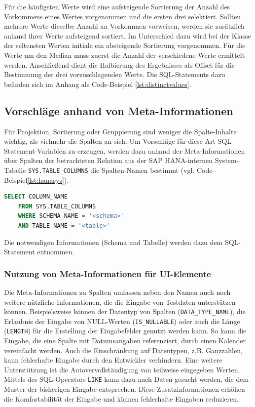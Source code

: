 Für die häufigsten Werte wird eine aufsteigende Sortierung der Anzahl des Vorkommens eines Wertes vorgenommen und die ersten drei selektiert.
Sollten mehrere Werte dieselbe Anzahl an Vorkommen vorweisen, werden sie zusätzlich anhand ihrer Werte aufsteigend sortiert.
Im Unterschied dazu wird bei der Klasse der seltensten Werten initiale ein absteigende Sortierung vorgenommen.
Für die Werte um den Median muss zuerst die Anzahl der verschiedene Werte ermittelt werden.
Anschließend dient die Halbierung des Ergebnisses als Offset für die Bestimmung der drei vorzuschlagenden Werte.
Die SQL-Statements dazu befinden sich im Anhang als Code-Beispiel \ref{lst:distinctvalues}.

\subsection{Vorschläge anhand von Meta-Informationen}\label{chap:databasemeta}
Für Projektion, Sortierung oder Gruppierung sind weniger die Spalte-Inhalte wichtig, als vielmehr die Spalten an sich.
Um Vorschläge für diese Art SQL-Statement-Variablen zu erzeugen, werden dazu anhand der Meta-Informationen über Spalten der betrachteten Relation aus der SAP HANA-internen System-Tabelle \texttt{SYS.TABLE\_COLUMNS} die Spalten-Namen bestimmt (vgl. Code-Beispiel\ref{lst:hanasys}).
\begin{lstlisting}[caption={Systemtabellen von SAP HANA liefern Meta-Informationen zu Relationen}, label={lst:hanasys}, language=SQL]
	SELECT COLUMN_NAME
	FROM SYS.TABLE_COLUMNS
	WHERE SCHEMA_NAME = '<schema>'
	AND TABLE_NAME = '<table>'
\end{lstlisting}
Die notwendigen Informationen (Schema und Tabelle) werden dazu dem SQL-Statement entnommen.

\subsubsection{Nutzung von Meta-Informationen für UI-Elemente}
Die Meta-Informationen zu Spalten umfassen neben den Namen auch noch weitere nützliche Informationen, die die Eingabe von Testdaten unterstützen können.
Beispielsweise können der Datentyp von Spalten (\texttt{DATA\_TYPE\_NAME}), die Erlaubnis der Eingabe von NULL-Werten (\texttt{IS\_NULLABLE}) oder auch die Länge (\texttt{LENGTH}) für die Erstellung der Eingabefelder genutzt werden kann.
So kann die Eingabe, die eine Spalte mit Datumsangaben referenziert, durch einen Kalender vereinfacht werden.
Auch die Einschränkung auf Datentypen, z.B. Ganzzahlen, kann fehlerhafte Eingabe durch den Entwickler verhindern.
Eine weitere Unterstützung ist die Autovervollständigung von teilweise eingegeben Werten.
Mittels des SQL-Operators \texttt{LIKE} kann dazu nach Daten gesucht werden, die dem Muster der bisherigen Eingabe entsprechen.
Diese Zusatzinformationen erhöhen die Komfortabilität der Eingabe und können fehlerhafte Eingaben reduzieren.


